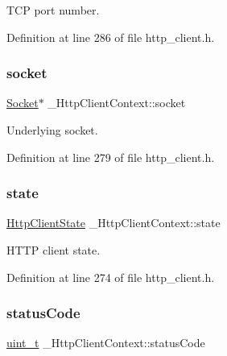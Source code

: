 T\+CP port number. 



Definition at line 286 of file http\+\_\+client.\+h.

\mbox{\label{struct__HttpClientContext_a72686bbb7eb9487b455050c7a4cb65fb}} 
\subsubsection{\texorpdfstring{socket}{socket}}
{\footnotesize\ttfamily \hyperlink{socket_8h_aa85acfb0fa336ef495e6ba87fb88fc48}{Socket}$\ast$ \+\_\+\+Http\+Client\+Context\+::socket}



Underlying socket. 



Definition at line 279 of file http\+\_\+client.\+h.

\mbox{\label{struct__HttpClientContext_ab4710b3c68efc0249153457789738304}} 
\subsubsection{\texorpdfstring{state}{state}}
{\footnotesize\ttfamily \hyperlink{http__client_8h_a467beb99e0cff97a16b2ef23a0aaf8c5}{Http\+Client\+State} \+\_\+\+Http\+Client\+Context\+::state}



H\+T\+TP client state. 



Definition at line 274 of file http\+\_\+client.\+h.

\mbox{\label{struct__HttpClientContext_a94026ebed0cc42147986fb486c156d61}} 
\subsubsection{\texorpdfstring{status\+Code}{statusCode}}
{\footnotesize\ttfamily \hyperlink{compiler__port_8h_a12a1e9b3ce141648783a82445d02b58d}{uint\+\_\+t} \+\_\+\+Http\+Client\+Context\+::status\+Code}



